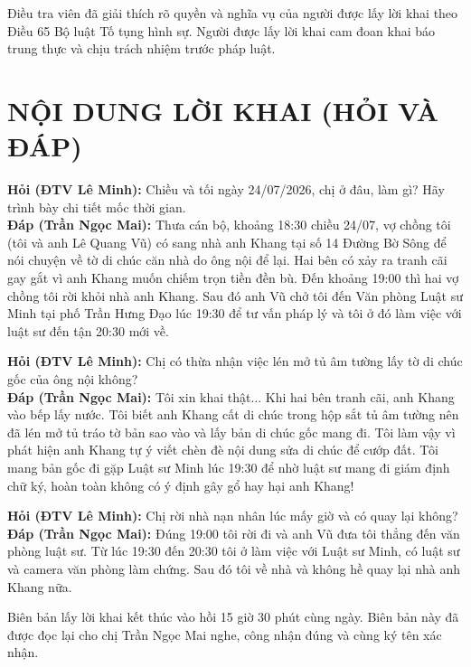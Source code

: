 \documentclass[12pt,a4paper]{article}
\begin{document}
\noindent Điều tra viên đã giải thích rõ quyền và nghĩa vụ của người được lấy lời khai theo Điều 65 Bộ luật Tố tụng hình sự. Người được lấy lời khai cam đoan khai báo trung thực và chịu trách nhiệm trước pháp luật.

\section*{NỘI DUNG LỜI KHAI (HỎI VÀ ĐÁP)}

\noindent \textbf{Hỏi (ĐTV Lê Minh):} Chiều và tối ngày 24/07/2026, chị ở đâu, làm gì? Hãy trình bày chi tiết mốc thời gian.\\
\textbf{Đáp (Trần Ngọc Mai):} Thưa cán bộ, khoảng 18:30 chiều 24/07, vợ chồng tôi (tôi và anh Lê Quang Vũ) có sang nhà anh Khang tại số 14 Đường Bờ Sông để nói chuyện về tờ di chúc căn nhà do ông nội để lại. Hai bên có xảy ra tranh cãi gay gắt vì anh Khang muốn chiếm trọn tiền đền bù. Đến khoảng 19:00 thì hai vợ chồng tôi rời khỏi nhà anh Khang. Sau đó anh Vũ chở tôi đến Văn phòng Luật sư Minh tại phố Trần Hưng Đạo lúc 19:30 để tư vấn pháp lý và tôi ở đó làm việc với luật sư đến tận 20:30 mới về.

\noindent \textbf{Hỏi (ĐTV Lê Minh):} Chị có thừa nhận việc lén mở tủ âm tường lấy tờ di chúc gốc của ông nội không?\\
\textbf{Đáp (Trần Ngọc Mai):} Tôi xin khai thật... Khi hai bên tranh cãi, anh Khang vào bếp lấy nước. Tôi biết anh Khang cất di chúc trong hộp sắt tủ âm tường nên đã lén mở tủ tráo tờ bản sao vào và lấy bản di chúc gốc mang đi. Tôi làm vậy vì phát hiện anh Khang tự ý viết chèn đè nội dung sửa di chúc để cướp đất. Tôi mang bản gốc đi gặp Luật sư Minh lúc 19:30 để nhờ luật sư mang đi giám định chữ ký, hoàn toàn không có ý định gây gổ hay hại anh Khang!

\noindent \textbf{Hỏi (ĐTV Lê Minh):} Chị rời nhà nạn nhân lúc mấy giờ và có quay lại không?\\
\textbf{Đáp (Trần Ngọc Mai):} Đúng 19:00 tôi rời đi và anh Vũ đưa tôi thẳng đến văn phòng luật sư. Từ lúc 19:30 đến 20:30 tôi ở làm việc với Luật sư Minh, có luật sư và camera văn phòng làm chứng. Sau đó tôi về nhà và không hề quay lại nhà anh Khang nữa.

\noindent Biên bản lấy lời khai kết thúc vào hồi 15 giờ 30 phút cùng ngày. Biên bản này đã được đọc lại cho chị Trần Ngọc Mai nghe, công nhận đúng và cùng ký tên xác nhận.

\vspace{0.8cm}
\end{document}
